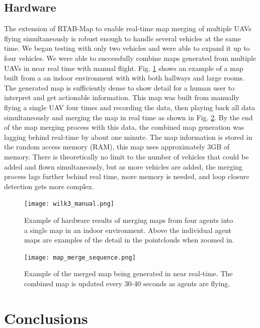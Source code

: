 \documentclass[letterpaper, 10 pt, conference]{ieeeconf}  %
\begin{document}
\subsection{Hardware}

The extension of RTAB-Map to enable real-time map merging of multiple UAVs flying simultaneously is robust enough to handle several vehicles at the same time. We began testing with only two vehicles and were able to expand it up to four vehicles. We were able to successfully combine maps generated from multiple UAVs in near real time with manual flight. Fig. \ref{fig:wilk3_map} shows an example of a map built from a an indoor environment with with both hallways and large rooms. The generated map is sufficiently dense to show detail for a human user to interpret and get actionable information. This map was built from manually flying a single UAV four times and recording the data, then playing back all data simultaneously and merging the map in real time as shown in Fig. \ref{fig:map_seq}. By the end of the map merging process with this data, the combined map generation was lagging behind real-time by about one minute. The map information is stored in the random access memory (RAM), this map uses approximately 3GB of memory. There is theoretically no limit to the number of vehicles that could be added and flown simultaneously, but as more vehicles are added, the merging process lags further behind real time, more memory is needed, and loop closure detection gets more complex.

\begin{figure}
\centering
\texttt{[image: wilk3\_manual.png]}
\caption[Map generated from four combined maps in hardware manual flight.]{Example of hardware results of merging maps from four agents into a single map in an indoor environment. Above the individual agent maps are examples of the detail in the pointclouds when zoomed in.}
\label{fig:wilk3_map}
\end{figure}

\begin{figure}
\centering
\texttt{[image: map\_merge\_sequence.png]}
\caption[An example of the map merging process over time.]{Example of the merged map being generated in near real-time. The combined map is updated every 30-40 seconds as agents are flying.}
\label{fig:map_seq}
\end{figure}

\section{Conclusions}\label{nav_conclusions}
\end{document}
